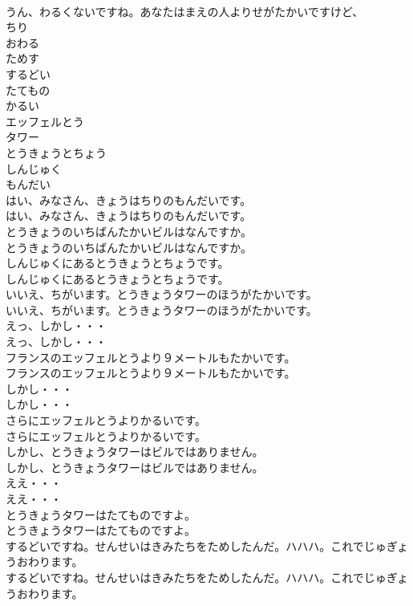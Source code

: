 \documentclass[8pt]{extreport}
\begin{document}
\begin{CJK}{UTF8}{min}
\\	うん、わるくないですね。あなたはまえの人よりせがたかいですけど、 
\\	ちり
\\	おわる
\\	ためす
\\	するどい
\\	たてもの
\\	かるい
\\	エッフェルとう
\\	タワー
\\	とうきょうとちょう
\\	しんじゅく
\\	もんだい
\\	はい、みなさん、きょうはちりのもんだいです。	
\\	はい、みなさん、きょうはちりのもんだいです。 
\\	とうきょうのいちばんたかいビルはなんですか。	
\\	とうきょうのいちばんたかいビルはなんですか。 
\\	しんじゅくにあるとうきょうとちょうです。	
\\	しんじゅくにあるとうきょうとちょうです。 
\\	いいえ、ちがいます。とうきょうタワーのほうがたかいです。	
\\	いいえ、ちがいます。とうきょうタワーのほうがたかいです。 
\\	えっ、しかし・・・	
\\	えっ、しかし・・・ 
\\	フランスのエッフェルとうより９メートルもたかいです。	
\\	フランスのエッフェルとうより９メートルもたかいです。 
\\	しかし・・・	
\\	しかし・・・ 
\\	さらにエッフェルとうよりかるいです。	
\\	さらにエッフェルとうよりかるいです。 
\\	しかし、とうきょうタワーはビルではありません。	
\\	しかし、とうきょうタワーはビルではありません。 
\\	ええ・・・	
\\	ええ・・・ 
\\	とうきょうタワーはたてものですよ。	
\\	とうきょうタワーはたてものですよ。 
\\	するどいですね。せんせいはきみたちをためしたんだ。ハハハ。これでじゅぎょうおわります。	
\\	するどいですね。せんせいはきみたちをためしたんだ。ハハハ。これでじゅぎょうおわります。 

\end{CJK}
\end{document}

